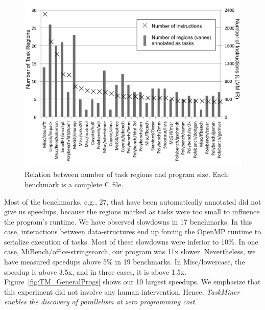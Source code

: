 \documentclass[sigplan,10pt,screen]{acmart}
\newcommand\Taskminer{\mbox{\textsf{TaskMiner}}}
\begin{document}
\begin{figure}[htb]
\begin{center}
\includegraphics[width=1\columnwidth]{images/TM_Versatility}
\caption{Relation between number of task regions and program size.
Each benchmark is a complete C file.}
\label{fig:TM_Versatility}
\end{center}
\end{figure}

Most of the benchmarks, e.g., 27, that have been automatically annotated did not
give us speedups, because the regions marked as tasks were too small to influence
the program's runtime.
We have observed slowdowns in 17 benchmarks.
In this case, interactions between data-structures end up forcing the OpenMP
runtime to serialize execution of tasks.
Most of these slowdowns were inferior to 10\%.
In one case, \textsf{MiBench/office-stringsearch}, our program was 11x slower.
Nevertheless, we have measured speedups above 5\% in 19 benchmarks.
In \textsf{Misc/lowercase}, the speedup is above 3.5x, and in
three cases, it is above 1.5x.
Figure~\ref{fig:TM_GeneralProgs} shows our 10 largest speedups.
We emphasize that this experiment did not involve any human intervention.
Hence, {\em \Taskminer{} enables the discovery of parallelism at
zero programming cost}.
\end{document}

